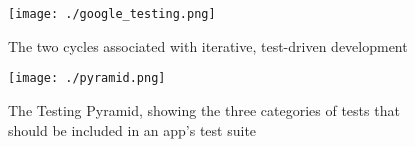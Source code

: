 \begin{figure}[htb]
	\centering
	\texttt{[image: ./google\_testing.png]}
	\caption[The two cycles associated with iterative, test-driven development]{The two cycles associated with iterative, test-driven development\footnotemark}
	\label{fig_google_testing}
\end{figure}

\begin{figure}[htb]
	\centering
	\texttt{[image: ./pyramid.png]}
	\caption[The Testing Pyramid, showing the three categories of tests that should be included in an app's test suite]{The Testing Pyramid, showing the three categories of tests that should be included in an app's test suite\footnotemark}
	\label{fig_google_pyramid}
\end{figure}
